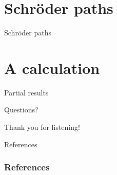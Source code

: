 \documentclass[12pt,mathserif]{beamer}
\begin{document}
\section{Schröder paths}

\begin{frame}[allowframebreaks]{Schröder paths}
\end{frame}

\section{A calculation}

\begin{frame}[allowframebreaks]{Partial results}
\end{frame}

\begin{frame}[plain]
\centerline{Questions?}
\end{frame}

\begin{frame}[plain]
\centerline{Thank you for listening!}
\end{frame}

\begin{frame}[allowframebreaks]{References}
\frametitle{References}
\nocite{*}


\end{frame}
\end{document}
